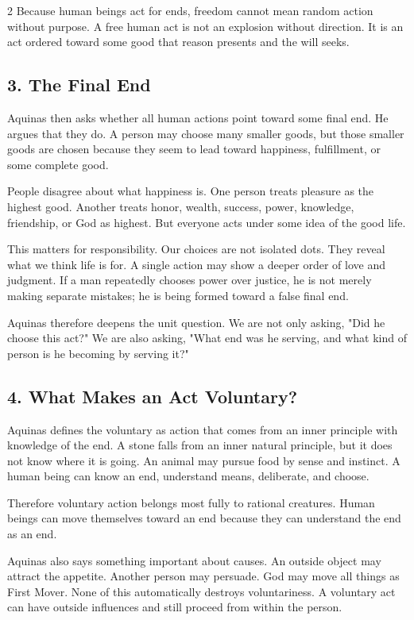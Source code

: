 \documentclass[12pt]{article}
\begin{document}
\begin{multicols}{2}
Because human beings act for ends, freedom cannot mean random action without purpose. A free human act is not an explosion without direction. It is an act ordered toward some good that reason presents and the will seeks.

\subsection*{3. The Final End}
Aquinas then asks whether all human actions point toward some final end. He argues that they do. A person may choose many smaller goods, but those smaller goods are chosen because they seem to lead toward happiness, fulfillment, or some complete good.

People disagree about what happiness is. One person treats pleasure as the highest good. Another treats honor, wealth, success, power, knowledge, friendship, or God as highest. But everyone acts under some idea of the good life.

This matters for responsibility. Our choices are not isolated dots. They reveal what we think life is for. A single action may show a deeper order of love and judgment. If a man repeatedly chooses power over justice, he is not merely making separate mistakes; he is being formed toward a false final end.

Aquinas therefore deepens the unit question. We are not only asking, "Did he choose this act?" We are also asking, "What end was he serving, and what kind of person is he becoming by serving it?"

\subsection*{4. What Makes an Act Voluntary?}
Aquinas defines the voluntary as action that comes from an inner principle with knowledge of the end. A stone falls from an inner natural principle, but it does not know where it is going. An animal may pursue food by sense and instinct. A human being can know an end, understand means, deliberate, and choose.

Therefore voluntary action belongs most fully to rational creatures. Human beings can move themselves toward an end because they can understand the end as an end.

Aquinas also says something important about causes. An outside object may attract the appetite. Another person may persuade. God may move all things as First Mover. None of this automatically destroys voluntariness. A voluntary act can have outside influences and still proceed from within the person.


\end{multicols}
\end{document}

